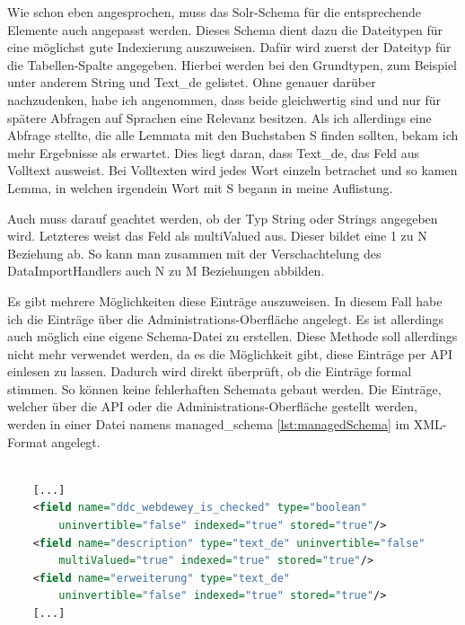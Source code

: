 Wie schon eben angesprochen, muss das Solr-Schema für die entsprechende Elemente auch angepasst werden. Dieses Schema dient dazu die Dateitypen für eine möglichst gute Indexierung auszuweisen. Dafür wird zuerst der Dateityp für die Tabellen-Spalte angegeben. Hierbei werden bei den Grundtypen, zum Beispiel unter anderem String und Text\_de gelistet. Ohne genauer darüber nachzudenken, habe ich angenommen, dass beide gleichwertig sind und nur für spätere Abfragen auf Sprachen eine Relevanz besitzen. Als ich allerdings eine Abfrage stellte, die alle Lemmata mit den Buchstaben S finden sollten, bekam ich mehr Ergebnisse als erwartet. Dies liegt daran, dass Text\_de, das Feld aus Volltext ausweist. 
Bei Volltexten wird jedes Wort einzeln betrachet und so kamen Lemma, in welchen irgendein Wort mit S begann in meine Auflistung. 

Auch muss darauf geachtet werden, ob der Typ String oder Strings angegeben wird. Letzteres weist das Feld als multiValued aus. Dieser bildet eine 1 zu N Beziehung ab. So kann man zusammen mit der Verschachtelung des DataImportHandlers auch N zu M Beziehungen abbilden.

Es gibt mehrere Möglichkeiten diese Einträge auszuweisen. In diesem Fall habe ich die Einträge über die Administrations-Oberfläche angelegt. Es ist allerdings auch möglich eine eigene Schema-Datei zu erstellen. Diese Methode soll allerdings nicht mehr verwendet werden, da es die Möglichkeit gibt, diese Einträge per API einlesen zu lassen. Dadurch wird direkt überprüft, ob die Einträge formal stimmen. So können keine fehlerhaften Schemata gebaut werden. Die Einträge, welcher über die API oder die Administrations-Oberfläche gestellt werden, werden in einer Datei namens managed\_schema \ref{lst:managedSchema} im XML-Format angelegt.


\begin{lstlisting}[language=xml, frame=single, label={lst:managedSchema}, 
    morekeywords={type,uninvertible,indexed,stored,field,multiValued, name}] 

    [...]
    <field name="ddc_webdewey_is_checked" type="boolean" 
        uninvertible="false" indexed="true" stored="true"/>
    <field name="description" type="text_de" uninvertible="false" 
        multiValued="true" indexed="true" stored="true"/>
    <field name="erweiterung" type="text_de" 
        uninvertible="false" indexed="true" stored="true"/>
    [...]

\end{lstlisting}

